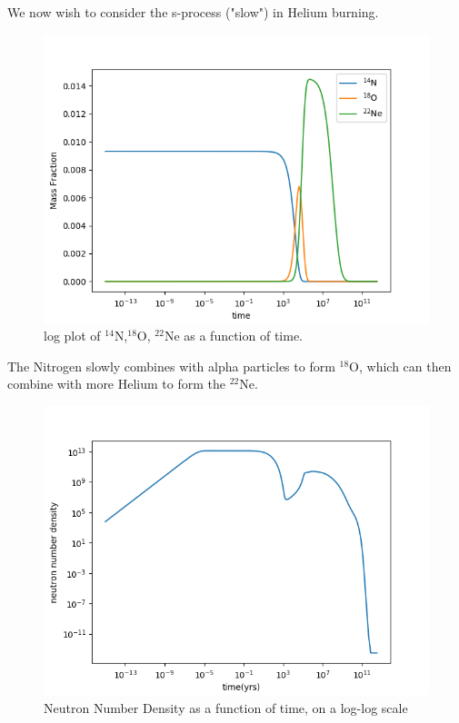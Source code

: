 \documentclass[manuscript]{aastex62}
\begin{document}
We now wish to consider the s-process ("slow") in Helium burning. 

\begin{figure}[H]
\centering
\includegraphics[scale=0.7]{task3}
\caption{log plot of $^{14}$N,$^{18}$O, $^{22}$Ne as a function of time.}
\end{figure}

The Nitrogen slowly combines with alpha particles to form $^{18}$O, which can then combine with more Helium to form the $^{22}$Ne.

\begin{figure}[H]
\centering
\includegraphics[scale=0.7]{neutron}
\caption{Neutron Number Density as a function of time, on a log-log scale}
\end{figure}
\end{document}
